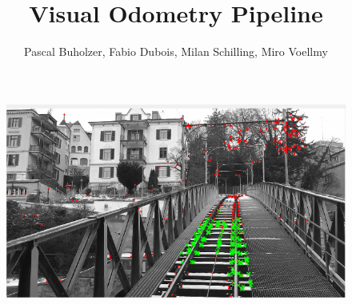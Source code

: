 \documentclass[a4paper,10pt]{article} %
\title{Visual Odometry Pipeline}
\author{Pascal Buholzer, Fabio Dubois, Milan Schilling, Miro Voellmy}
\begin{document}
\vspace*{3cm}
{\let\newpage\relax\maketitle}

\begin{figure}[ht]
	\centering
	\includegraphics[width=\textwidth]{poly_title}
	\label{img_title}
\end{figure}

\newpage

\tableofcontents
\newpage

\newpage

\newpage

\newpage

\newpage


\newpage
%
\end{document}
